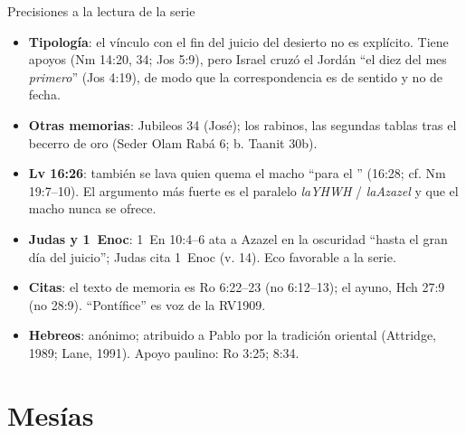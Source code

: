 \begin{frame}{Precisiones a la lectura de la serie}
\scriptsize
\begin{itemize}\setlength{\itemsep}{2pt}
\item \textbf{Tipología}: el vínculo con el fin del juicio del desierto no es explícito. Tiene apoyos (Nm 14:20, 34; Jos 5:9), pero Israel cruzó el Jordán ``el diez del mes \emph{primero}'' (Jos 4:19), de modo que la correspondencia es de sentido y no de fecha.
\item \textbf{Otras memorias}: Jubileos 34 (José); los rabinos, las segundas tablas tras el becerro de oro (Seder Olam Rabá 6; b. Taanit 30b).
\item \textbf{Lv 16:26}: también se lava quien quema el macho ``para el \SENOR'' (16:28; cf. Nm 19:7--10). El argumento más fuerte es el paralelo \emph{laYHWH} / \emph{laAzazel} y que el macho nunca se ofrece.
\item \textbf{Judas y 1~Enoc}: 1~En 10:4--6 ata a Azazel en la oscuridad ``hasta el gran día del juicio''; Judas cita 1~Enoc (v. 14). Eco favorable a la serie.
\item \textbf{Citas}: el texto de memoria es Ro 6:22--23 (no 6:12--13); el ayuno, Hch 27:9 (no 28:9). ``Pontífice'' es voz de la RV1909.
\item \textbf{Hebreos}: anónimo; atribuido a Pablo por la tradición oriental (Attridge, 1989; Lane, 1991). Apoyo paulino: Ro 3:25; 8:34.
\end{itemize}
\end{frame}

\section{Mesías}

